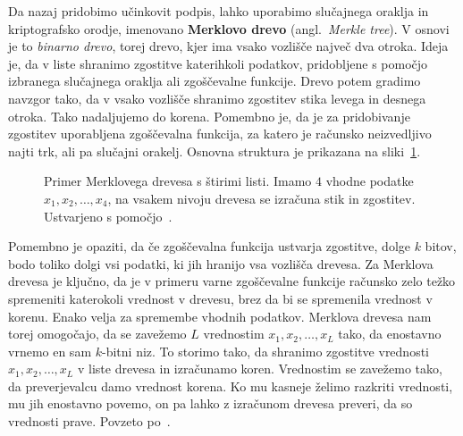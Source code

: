 Da nazaj pridobimo učinkovit podpis, lahko uporabimo slučajnega oraklja in kriptografsko
orodje, imenovano \textbf{Merklovo drevo} (angl.\ \textit{Merkle tree}). V osnovi je to
\textit{binarno drevo}, torej drevo, kjer ima vsako vozlišče največ dva otroka. Ideja je, da v liste
shranimo zgostitve katerihkoli podatkov, pridobljene s pomočjo izbranega slučajnega oraklja ali zgoščevalne
funkcije. Drevo potem gradimo navzgor tako, da v vsako vozlišče shranimo zgostitev stika levega in desnega
otroka. Tako nadaljujemo do korena. Pomembno je, da je za pridobivanje zgostitev uporabljena zgoščevalna
funkcija, za katero je računsko neizvedljivo najti trk, ali pa slučajni orakelj. Osnovna
struktura je prikazana na sliki~\ref{fig:merkle}.
\begin{figure}[ht]
  \centering
  \caption[Merklovo drevo.]{Primer Merklovega drevesa s štirimi listi. Imamo $4$ vhodne podatke
    $x_1, x_2, \dots, x_4$, na vsakem nivoju drevesa se izračuna stik in zgostitev. Ustvarjeno s 
    pomočjo~\cite{SOtikz}.}
  \label{fig:merkle}
\end{figure}

Pomembno je opaziti, da če zgoščevalna funkcija ustvarja zgostitve, dolge $k$ bitov, bodo toliko
dolgi vsi podatki, ki jih hranijo vsa vozlišča drevesa. Za Merklova drevesa je ključno, da je v primeru
varne zgoščevalne funkcije računsko zelo težko spremeniti katerokoli vrednost v drevesu, brez da bi se
spremenila vrednost v korenu. Enako velja za spremembe vhodnih podatkov. Merklova drevesa nam torej
omogočajo, da se zavežemo $L$ vrednostim $x_1, x_2, \dots, x_L$ tako, da enostavno vrnemo en sam
$k$-bitni niz. To storimo tako, da shranimo zgostitve vrednosti $x_1, x_2, \dots, x_L$ v liste drevesa
in izračunamo koren. Vrednostim se zavežemo tako, da preverjevalcu damo vrednost korena. Ko mu kasneje
želimo razkriti vrednosti, mu jih enostavno povemo, on pa lahko z izračunom drevesa preveri, da so
vrednosti prave. Povzeto po~\cite{micali2000csproofs}.

